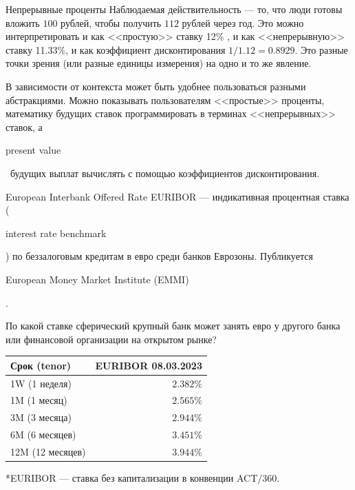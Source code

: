 \documentclass{beamer}
\newcommand{\en}[1]{\begin{otherlanguage}{english}#1\end{otherlanguage}}
\begin{document}
\begin{frame}{Непрерывные проценты}
\justify
Наблюдаемая действительность --- то, что люди готовы вложить $100$ рублей, чтобы получить $112$ рублей через год. Это можно интерпретировать и как <<простую>> ставку 12\% , и как <<непрерывную>> ставку 11.33\%, и как коэффициент дисконтирования $1/1.12 = 0.8929$. Это разные точки зрения (или разные единицы измерения) на одно и то же явление.

\justify 
В зависимости от контекста может быть удобнее пользоваться разными абстракциями. Можно показывать пользователям <<простые>> проценты, математику будущих ставок программировать в терминах <<непрерывных>> ставок, а \en{present value}\ будущих выплат вычислять с помощью коэффициентов дисконтирования.
\end{frame}



\begin{frame}{European Interbank Offered Rate}
\justify
\alert{EURIBOR} --- индикативная процентная ставка (\en{interest rate benchmark}) по беззалоговым кредитам в евро среди банков Еврозоны. Публикуется \en{European Money Market Institute (EMMI)}.

\justify
По какой ставке сферический крупный банк может занять евро у другого банка или финансовой организации на открытом рынке? 

\justify
\centering
\begin{tabular}{l|r}
Срок (tenor)     & EURIBOR 08.03.2023 \\ \hline
1W (1 неделя)    & $2.382\%$ \\
1M (1 месяц)     & $2.565\%$ \\
3M (3 месяца)    & $2.944\%$ \\
6M (6 месяцев)   & $3.451\%$ \\
12M (12 месяцев) & $3.944\%$ 
\end{tabular}

\justify
*EURIBOR --- ставка без капитализации в конвенции ACT/360.
\end{frame}
\end{document}
